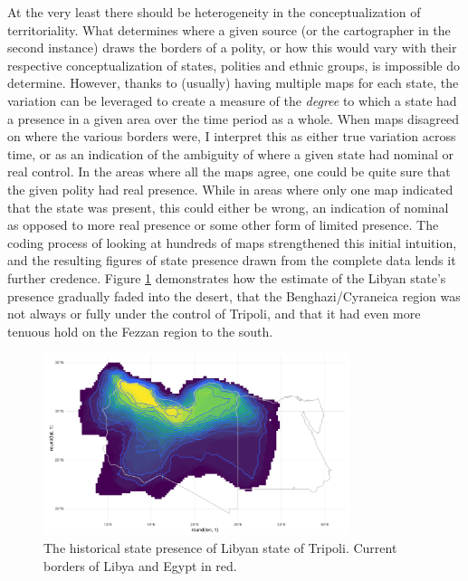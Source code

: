 \documentclass[12pt]{article}
\begin{document}
At the very least there should be heterogeneity in the conceptualization of
territoriality. What determines where a given source (or the cartographer in the
second instance) draws the borders of a polity, or how this would vary with
their respective conceptualization of states, polities and ethnic groups, is
impossible do determine. However, thanks to (usually) having multiple maps for
each state, the variation can be leveraged to create a measure of the
\textit{degree} to which a state had a presence in a given area over the time
period as a whole. When maps disagreed on where the various borders were, I
interpret this as either true variation across time, or as an indication of the
ambiguity of where a given state had nominal or real control. In the areas where
all the maps agree, one could be quite sure that the given polity had real
presence.  While in areas where only one map indicated that the state was
present, this could either be wrong, an indication of nominal as opposed to more
real presence or some other form of limited presence. The coding process of
looking at hundreds of maps strengthened this initial intuition, and the
resulting figures of state presence drawn from the complete data lends it
further credence. Figure \ref{libya} demonstrates how the estimate
of the Libyan state's presence gradually faded into the desert, that the
Benghazi/Cyraneica region was not always or fully under the control of Tripoli,
and that it had even more tenuous hold on the Fezzan region to the south.

\begin{figure}[htpb]
	\centering
	\includegraphics[width=0.8\textwidth,keepaspectratio]{../R/Output/libya.pdf}
	\caption{The historical state presence of Libyan state of Tripoli.
	Current borders of Libya and Egypt in red.}
	\label{libya}
\end{figure}
\end{document}
